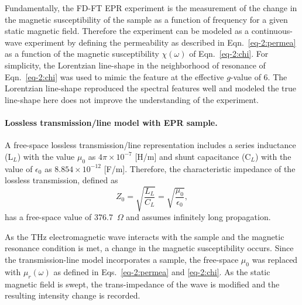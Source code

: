 Fundamentally, the FD-FT EPR experiment is the measurement of the change in the magnetic susceptibility of the sample as a function of frequency for a given static magnetic field. Therefore the experiment can be modeled as a continuous-wave experiment by defining the permeability as described in Eqn.~\ref{eq-2:permea} as a function of the magnetic susceptibility $\chi(\omega)$ of Eqn.~\ref{eq-2:chi}. For simplicity, the Lorentzian line-shape in the neighborhood of resonance of Eqn.~\ref{eq-2:chi} was used to mimic the feature at the effective $g$-value of 6. The Lorentzian line-shape reproduced the spectral features well and modeled the true line-shape here does not improve the understanding of the experiment. 

\noindent \paragraph*{Lossless transmission\-/line model with EPR sample.} A free-space lossless transmission\-/line representation includes a series inductance (L$_L$) with the value $\mu_0$ as $4 \pi \times 10^{-7}$ [H/m] and shunt capacitance (C$_L$) with the value of $\epsilon_0$ as $8.854 \times 10^{-12}$ [F/m]. \cite{ramo1984fields} Therefore, the characteristic impedance of the lossless transmission, defined as
\begin{equation}
    Z_0 = \sqrt{\frac{L_L}{C_L}} = \sqrt{\frac{\mu_0}{\epsilon_0}},
\end{equation}
has a free-space value of 376.7~$\Omega$ and assumes infinitely long propagation. 

As the THz electromagnetic wave interacts with the sample and the magnetic resonance condition is met, a change in the magnetic susceptibility occurs. Since the transmission-line model incorporates a sample, the free-space $\mu_0$ was replaced with $\mu_r(\omega)$ as defined in Eqs.~\ref{eq-2:permea} and \ref{eq-2:chi}. As the static magnetic field is swept, the trans-impedance of the wave is modified and the resulting intensity change is recorded.


